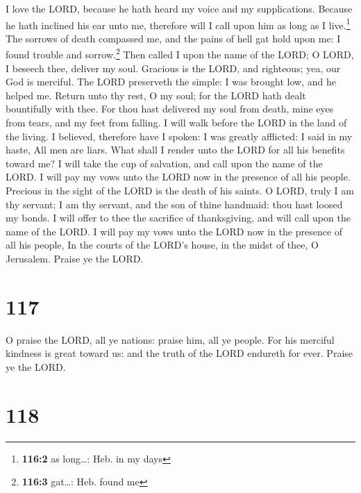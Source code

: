  I love the LORD, because he hath heard my voice and my
supplications.  Because he hath inclined his ear unto me,
therefore will I call upon him as long as I live.\footnote{\textbf{116:2}
  as long\ldots: Heb. in my days}  The sorrows of death
compassed me, and the pains of hell gat hold upon me: I found trouble
and sorrow.\footnote{\textbf{116:3} gat\ldots: Heb. found me}
 Then called I upon the name of the LORD; O LORD, I
beseech thee, deliver my soul.  Gracious is the LORD, and
righteous; yea, our God is merciful.  The LORD preserveth
the simple: I was brought low, and he helped me.  Return
unto thy rest, O my soul; for the LORD hath dealt bountifully with thee.
 For thou hast delivered my soul from death, mine eyes
from tears, and my feet from falling.  I will walk before
the LORD in the land of the living.  I believed,
therefore have I spoken: I was greatly afflicted:  I said
in my haste, All men are liars.  What shall I render unto
the LORD for all his benefits toward me?  I will take the
cup of salvation, and call upon the name of the LORD.  I
will pay my vows unto the LORD now in the presence of all his people.
 Precious in the sight of the LORD is the death of his
saints.  O LORD, truly I am thy servant; I am thy
servant, and the son of thine handmaid: thou hast loosed my bonds.
 I will offer to thee the sacrifice of thanksgiving, and
will call upon the name of the LORD.  I will pay my vows
unto the LORD now in the presence of all his people,  In
the courts of the LORD's house, in the midst of thee, O Jerusalem.
Praise ye the LORD.

\hypertarget{section-116}{%
\section{117}\label{section-116}}

 O praise the LORD, all ye nations: praise him, all ye
people.  For his merciful kindness is great toward us: and
the truth of the LORD endureth for ever. Praise ye the LORD.

\hypertarget{section-117}{%
\section{118}\label{section-117}}

